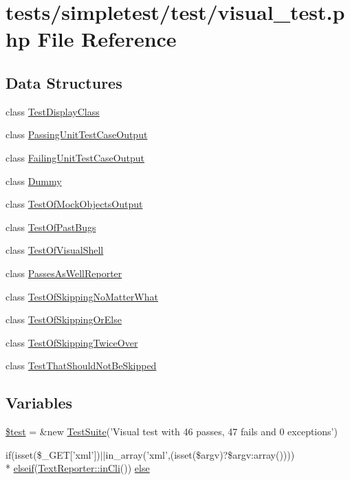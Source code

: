 \hypertarget{visual__test_8php}{\section{tests/simpletest/test/visual\-\_\-test.php File Reference}
\label{visual__test_8php}
}
\subsection*{Data Structures}
\begin{DoxyCompactItemize}
\item 
class \hyperlink{class_test_display_class}{Test\-Display\-Class}
\item 
class \hyperlink{class_passing_unit_test_case_output}{Passing\-Unit\-Test\-Case\-Output}
\item 
class \hyperlink{class_failing_unit_test_case_output}{Failing\-Unit\-Test\-Case\-Output}
\item 
class \hyperlink{class_dummy}{Dummy}
\item 
class \hyperlink{class_test_of_mock_objects_output}{Test\-Of\-Mock\-Objects\-Output}
\item 
class \hyperlink{class_test_of_past_bugs}{Test\-Of\-Past\-Bugs}
\item 
class \hyperlink{class_test_of_visual_shell}{Test\-Of\-Visual\-Shell}
\item 
class \hyperlink{class_passes_as_well_reporter}{Passes\-As\-Well\-Reporter}
\item 
class \hyperlink{class_test_of_skipping_no_matter_what}{Test\-Of\-Skipping\-No\-Matter\-What}
\item 
class \hyperlink{class_test_of_skipping_or_else}{Test\-Of\-Skipping\-Or\-Else}
\item 
class \hyperlink{class_test_of_skipping_twice_over}{Test\-Of\-Skipping\-Twice\-Over}
\item 
class \hyperlink{class_test_that_should_not_be_skipped}{Test\-That\-Should\-Not\-Be\-Skipped}
\end{DoxyCompactItemize}
\subsection*{Variables}
\begin{DoxyCompactItemize}
\item 
\hyperlink{visual__test_8php_a31daebf88fc668f410293e2c70cea3fc}{\$test} = \&new \hyperlink{class_test_suite}{Test\-Suite}('Visual test with 46 passes, 47 fails and 0 exceptions')
\item 
if(isset(\$\-\_\-\-G\-E\-T\mbox{[}'xml'\mbox{]})$|$$|$in\-\_\-array('xml',(isset(\$argv)?\$argv\-:array()))) \\*
\hyperlink{remote__test_8php_a7e3c7052d9d98df94e744d4aab6c9dd5}{elseif}(\hyperlink{class_simple_reporter_a9f916dbc56586ffd11af2e7bbba40888}{Text\-Reporter\-::in\-Cli}()) \hyperlink{visual__test_8php_aff26b541baa075ca5514c263db65b944}{else}
\end{DoxyCompactItemize}


